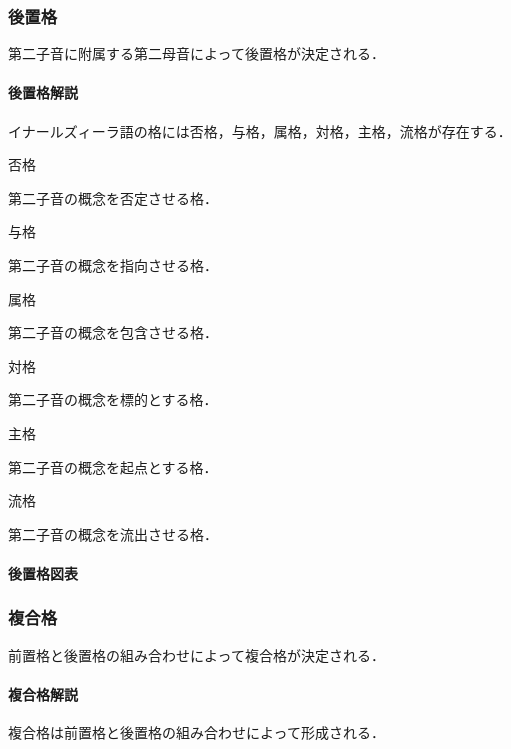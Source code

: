 \documentclass[
  japanese,
]{article}
\providecommand{\tightlist}{%
  \setlength{\itemsep}{0pt}\setlength{\parskip}{0pt}}
\begin{document}
\subsubsection{後置格}\label{section5.2}

第二子音に附属する第二母音によって後置格が決定される．

\paragraph{後置格解説}\label{subsection5.2.1}

イナールズィーラ語の格には否格，与格，属格，対格，主格，流格が存在する．

\begin{description}
\tightlist
\item[{◌◌a◌}]
否格

第二子音の概念を否定させる格．
\item[{◌◌e◌}]
与格

第二子音の概念を指向させる格．
\item[{◌◌i◌}]
属格

第二子音の概念を包含させる格．
\item[{◌◌o◌}]
対格

第二子音の概念を標的とする格．
\item[{◌◌u◌}]
主格

第二子音の概念を起点とする格．
\item[{◌◌w◌}]
流格

第二子音の概念を流出させる格．
\end{description}

\paragraph{後置格図表}\label{subsection5.2.2}

\subsubsection{複合格}\label{section5.3}

前置格と後置格の組み合わせによって複合格が決定される．

\paragraph{複合格解説}\label{subsection5.3.1}

\protect{}\label{complex-case}{複合格}は前置格と後置格の組み合わせによって形成される．
\end{document}
